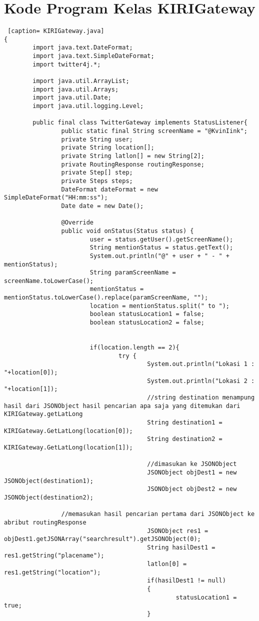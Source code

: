 \chapter{Kode Program Kelas KIRIGateway}
\label{Kode Program Kelas KIRIGateway}

\begin{lstlisting} [caption= KIRIGateway.java]
{ 
		import java.text.DateFormat;
		import java.text.SimpleDateFormat;
		import twitter4j.*;

		import java.util.ArrayList;
		import java.util.Arrays;
		import java.util.Date;
		import java.util.logging.Level;

		public final class TwitterGateway implements StatusListener{
				public static final String screenName = "@KvinIink";
				private String user;
				private String location[];
				private String latlon[] = new String[2];
				private RoutingResponse routingResponse;
				private Step[] step;
				private Steps steps;
				DateFormat dateFormat = new SimpleDateFormat("HH:mm:ss");
				Date date = new Date();
				
				@Override
				public void onStatus(Status status) {
						user = status.getUser().getScreenName();
						String mentionStatus = status.getText();
						System.out.println("@" + user + " - " + mentionStatus);
						String paramScreenName = screenName.toLowerCase();
						mentionStatus = mentionStatus.toLowerCase().replace(paramScreenName, "");
						location = mentionStatus.split(" to ");
						boolean statusLocation1 = false;
						boolean statusLocation2 = false;
						
						
						if(location.length == 2){
								try {
										System.out.println("Lokasi 1 : "+location[0]);
										System.out.println("Lokasi 2 : "+location[1]);
										//string destination menampung hasil dari JSONObject hasil pencarian apa saja yang ditemukan dari KIRIGateway.getLatLong
										String destination1 = KIRIGateway.GetLatLong(location[0]);
										String destination2 = KIRIGateway.GetLatLong(location[1]);
										
										//dimasukan ke JSONObject 
										JSONObject objDest1 = new JSONObject(destination1);
										JSONObject objDest2 = new JSONObject(destination2);
										
				//memasukan hasil pencarian pertama dari JSONObject ke abribut routingResponse
										JSONObject res1 = objDest1.getJSONArray("searchresult").getJSONObject(0);
										String hasilDest1 = res1.getString("placename");
										latlon[0] = res1.getString("location");
										if(hasilDest1 != null)
										{
												statusLocation1 = true;
										}
										

\end{lstlisting}
